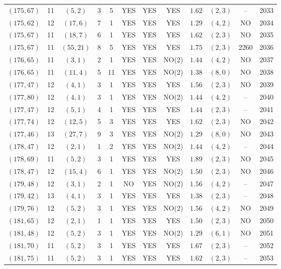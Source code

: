 \begin{longtable}{|c|c|c|c|c|c|c|c|c|c|c|c|}
$(175,67)$ & 11 & $(5,2)$ & 3 & 5 & YES & YES & YES & $1.62$ & $(2,3)$ & -- & 2033\\
$(175,62)$ & 12 & $(17,6)$ & 7 & 1 & YES & YES & YES & $1.29$ & $(4,2)$ & NO & 2034\\
$(175,67)$ & 11 & $(18,7)$ & 6 & 1 & YES & YES & YES & $1.62$ & $(2,3)$ & NO & 2035\\
$(175,67)$ & 11 & $(55,21)$ & 8 & 5 & YES & YES & YES & $1.75$ & $(2,3)$ & 2260 & 2036\\
$(176,65)$ & 11 & $(3,1)$ & 2 & 1 & YES & YES & NO(2) & $1.44$ & $(4,2)$ & NO & 2037\\
$(176,65)$ & 11 & $(11,4)$ & 5 & 11 & YES & YES & NO(2) & $1.38$ & $(8,0)$ & NO & 2038\\
$(177,47)$ & 12 & $(4,1)$ & 3 & 1 & YES & YES & YES & $1.56$ & $(2,3)$ & NO & 2039\\
$(177,80)$ & 12 & $(4,1)$ & 3 & 1 & YES & YES & NO(2) & $1.44$ & $(4,2)$ & -- & 2040\\
$(177,47)$ & 12 & $(5,1)$ & 4 & 1 & YES & YES & YES & $1.44$ & $(2,3)$ & -- & 2041\\
$(177,74)$ & 12 & $(12,5)$ & 5 & 3 & YES & YES & YES & $1.62$ & $(2,3)$ & NO & 2042\\
$(177,46)$ & 13 & $(27,7)$ & 9 & 3 & YES & YES & NO(2) & $1.29$ & $(8,0)$ & NO & 2043\\
$(178,47)$ & 12 & $(2,1)$ & 1 & 2 & YES & YES & NO(2) & $1.44$ & $(4,2)$ & -- & 2044\\
$(178,69)$ & 11 & $(5,2)$ & 3 & 1 & YES & YES & YES & $1.89$ & $(2,3)$ & NO & 2045\\
$(178,47)$ & 12 & $(15,4)$ & 6 & 1 & YES & YES & NO(2) & $1.50$ & $(2,3)$ & NO & 2046\\
$(179,48)$ & 12 & $(3,1)$ & 2 & 1 & NO & YES & NO(2) & $1.56$ & $(4,2)$ & -- & 2047\\
$(179,42)$ & 13 & $(4,1)$ & 3 & 1 & YES & YES & YES & $1.38$ & $(2,3)$ & -- & 2048\\
$(179,76)$ & 12 & $(5,2)$ & 3 & 1 & YES & YES & NO(2) & $1.56$ & $(4,2)$ & NO & 2049\\
$(181,65)$ & 12 & $(2,1)$ & 1 & 1 & YES & YES & YES & $1.50$ & $(2,3)$ & NO & 2050\\
$(181,48)$ & 12 & $(5,2)$ & 3 & 1 & YES & YES & NO(2) & $1.29$ & $(6,1)$ & NO & 2051\\
$(181,70)$ & 11 & $(5,2)$ & 3 & 1 & YES & YES & YES & $1.67$ & $(2,3)$ & -- & 2052\\
$(181,75)$ & 11 & $(5,2)$ & 3 & 1 & YES & YES & YES & $1.62$ & $(2,3)$ & -- & 2053\\

\end{longtable}
